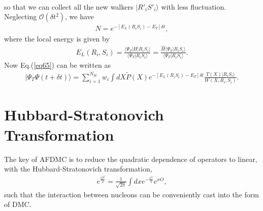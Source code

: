 \documentclass[12pt,letterpaper,UTF8]{report}
\begin{document}
{\begin{eqnarray}
\end{eqnarray}
so that we can collect all the new walkers $|R'_i S'_i \rangle$ with less fluctuation. Neglecting $\mathcal{O}(\delta t^2)$, we have
\begin{eqnarray}
N=e^{-[E_L(R_i S_i) - E_T]\delta t  },
\end{eqnarray}
where the local energy is given by
\begin{eqnarray}
E_L(R_i, S_i) = \frac{\langle \Psi_T | H |R_i S_i\rangle}{ \langle \Psi_T |R_i S_i \rangle  }
=\frac{\hat{H} \langle \Psi_T | R_i S_i\rangle}{ \langle \Psi_T |R_i S_i \rangle  }.
\end{eqnarray}
Now Eq.(\ref{eq65}) can be written as
\begin{eqnarray}
|\Psi_T \Psi(t+\delta t) \rangle = \sum_{i=1}^{N_W} w_i \int dX \tilde{P}(X) e^{-[E_L(R_i S_i) - E_T]\delta t  }
\frac{T(X)| R_i S_i \rangle}{W(X,R_i,S_i)}.
\end{eqnarray}


\section{Hubbard-Stratonovich Transformation}
The key of AFDMC is to reduce the quadratic dependence of operators to linear, with the Hubbard-Stratonovich transformation,
\begin{eqnarray}
e^{\frac{O^2}{2}} = \frac{1}{\sqrt{2\pi}} \int dx e^{-\frac{x^2}{2}} e^{xO}, \label{HST}
\end{eqnarray}
such that the interaction between nucleons can be conveniently cast into the form of DMC.

}
\end{document}
